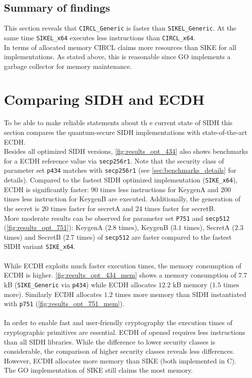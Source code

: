 \subsection{Summary of findings}

This section reveals that \texttt{CIRCL\_Generic} is faster than  \texttt{SIKEL\_Generic}. At the same time \texttt{SIKEL\_x64} executes less instructions than \texttt{CIRCL\_x64}.\\
In terms of allocated memory  \gls{CIRCL} claims more resources than \gls{SIKE} for all implementations. As stated above, this is reasonable since GO implements a garbage collector for memory maintenance.

\section{Comparing \gls{SIDH} and \gls{ECDH}} \label{sec:analysis_effiency_ecdh}

To be able to make reliable statements about th	e current state of \gls{SIDH} this section compares the quantum-secure \gls{SIDH} implementations with state-of-the-art \gls{ECDH}. \\
Besides all optimized \gls{SIDH} versions, \autoref{fig:results_opt_434} also shows benchmarks for a \gls{ECDH} reference value via \texttt{secp256r1}. Note that the security class of parameter set \texttt{p434} matches with \texttt{secp256r1} (see \autoref{sec:benchmarks_details} for details). Compared to the fastest \gls{SIDH} optimized implementation (\texttt{SIKE\_x64}), \gls{ECDH} is significantly faster: $90$ times less instructions for KeygenA and $200$ times less instruction for KeygenB are executed. Additionally, the generation of the secret is $20$ times faster for secretA and $24$ times faster for secretB.\\
More moderate results can be observed for parameter set \texttt{P751} and \texttt{secp512} (\autoref{fig:results_opt_751}): KeygenA ($2.8$ times),  KeygenB ($3.1$ times), SecretA ($2.3$ times) and SecretB ($2.7$ times) of \texttt{secp512} are faster compared to the fastest \gls{SIDH} variant \texttt{SIKE\_x64}.
\\\\
While \gls{ECDH} exploits much faster execution times, the memory consumption of \gls{ECDH} is higher.  \autoref{fig:results_opt_434_mem} shows a memory consumption of $7.7$ \gls{kB} (\texttt{SIKE\_Generic} via \texttt{p434}) while \gls{ECDH} allocates $12.2$ \gls{kB} memory ($1.5$ times more). Similarly \gls{ECDH} allocates $1.2$ times more memory than \gls{SIDH} instantiated with \texttt{p751} (\autoref{fig:results_opt_751_mem}).
\\\\
In order to enable fast and user-friendly cryptography the execution times of cryptographic primitives are essential. \gls{ECDH} of \gls{openssl} requires less instructions than all \gls{SIDH} libraries. While the difference to lower security classes is considerable, the comparison of higher security classes reveals less differences. However, \gls{ECDH} allocates more memory than \gls{SIKE} (both implemented in C). The GO implementation of \gls{SIKE} still claims the most memory.

